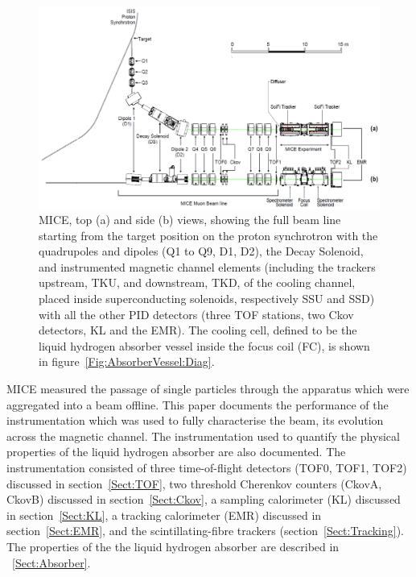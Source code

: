 \begin{figure}[htb!]
  \begin{center}
    \includegraphics[width=1.0\columnwidth]{BL.png}
    \caption{
      MICE, top (a) and side (b) views, showing the full beam line
      starting from the target position on the proton synchrotron with the quadrupoles and dipoles (Q1 to Q9, D1, D2), the
      Decay Solenoid, and instrumented magnetic channel elements
      (including the trackers upstream, TKU, and downstream, TKD, of the cooling
      channel, placed inside superconducting solenoids, respectively SSU and SSD) with all the
      other PID detectors (three TOF stations, two Ckov detectors, KL and
      the EMR).
      The cooling cell, defined to be the liquid hydrogen absorber
      vessel inside the focus coil (FC), is shown in figure~\ref{Fig:AbsorberVessel:Diag}.
    }
    \label{fig:BL}
  \end{center}
\end{figure}

MICE measured the passage of single particles through the apparatus which were aggregated into
a beam offline.
This paper documents the performance of the instrumentation which was
used to fully characterise the beam, its evolution across the magnetic
channel.
The instrumentation used to quantify the physical properties of the liquid hydrogen absorber are also documented.
The instrumentation consisted of three time-of-flight detectors
(TOF0, TOF1, TOF2) discussed in section~\ref{Sect:TOF}, two 
threshold Cherenkov counters (CkovA, CkovB) discussed in
section~\ref{Sect:Ckov}, a sampling calorimeter (KL) discussed in
section~\ref{Sect:KL}, a tracking calorimeter (EMR) discussed in
section~\ref{Sect:EMR}, and the scintillating-fibre trackers
(section~\ref{Sect:Tracking}).
The properties of the the liquid hydrogen
absorber are described in ~\ref{Sect:Absorber}.
